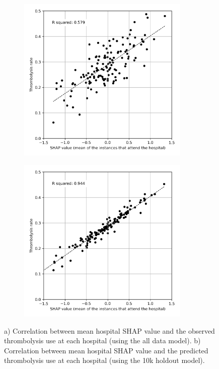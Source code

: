 \begin{figure}[!h]
\centering
\begin{subfigure}{.49\textwidth}
  \centering
    \includegraphics[width=0.9\textwidth]{./images/03c_xgb_10_features_attended_hosp_shap_value}
    \caption{}
  \label{fig:shap_correlation_subfigure_a}
\end{subfigure}
\begin{subfigure}{.49\textwidth}
  \centering
    \includegraphics[width=0.9\textwidth]{./images/04_xgb_10_features_10k_cohort_attended_hosp_shap_value}
    \caption{}
  \label{fig:shap_correlation_subfigure_b}
\end{subfigure}
\caption{a) Correlation between mean hospital SHAP value and the observed thrombolysis use at each hospital (using the all data model). b) Correlation between mean hospital SHAP value and the predicted thrombolysis use at each hospital (using the 10k holdout model).}
\end{figure}


